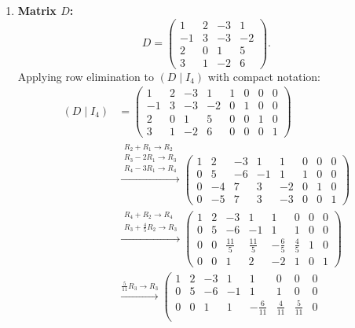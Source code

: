 \begin{exercisesolution*}
\begin{enumerate}[label=\textbf{(\alph*)}]
    \item \textbf{Matrix $D$:}
    \[
    D = \begin{pmatrix} 1 & 2 & -3 & 1 \\ -1 & 3 & -3 & -2 \\ 2 & 0 & 1 & 5 \\ 3 & 1 & -2 & 6 \end{pmatrix}.
    \]
    Applying row elimination to $(D \mid I_4)$ with compact notation:
    \begin{align*}
    (D \mid I_4) &=
    \left(\begin{array}{cccc|cccc}
    1 & 2 & -3 & 1 & 1 & 0 & 0 & 0 \\
    -1 & 3 & -3 & -2 & 0 & 1 & 0 & 0 \\
    2 & 0 & 1 & 5 & 0 & 0 & 1 & 0 \\
    3 & 1 & -2 & 6 & 0 & 0 & 0 & 1
    \end{array}\right) \\
    &\xrightarrow{\substack{R_2 + R_1 \to R_2 \\ R_3 - 2R_1 \to R_3 \\ R_4 - 3R_1 \to R_4}}
    \left(\begin{array}{cccc|cccc}
    1 & 2 & -3 & 1 & 1 & 0 & 0 & 0 \\
    0 & 5 & -6 & -1 & 1 & 1 & 0 & 0 \\
    0 & -4 & 7 & 3 & -2 & 0 & 1 & 0 \\
    0 & -5 & 7 & 3 & -3 & 0 & 0 & 1
    \end{array}\right) \\
    &\xrightarrow{\substack{R_4 + R_2 \to R_4 \\ R_3 + \frac{4}{5}R_2 \to R_3}}
    \left(\begin{array}{cccc|cccc}
    1 & 2 & -3 & 1 & 1 & 0 & 0 & 0 \\
    0 & 5 & -6 & -1 & 1 & 1 & 0 & 0 \\
    0 & 0 & \frac{11}{5} & \frac{11}{5} & -\frac{6}{5} & \frac{4}{5} & 1 & 0 \\
    0 & 0 & 1 & 2 & -2 & 1 & 0 & 1
    \end{array}\right) \\
    &\xrightarrow{\frac{5}{11}R_3 \to R_3}
    \left(\begin{array}{cccc|cccc}
    1 & 2 & -3 & 1 & 1 & 0 & 0 & 0 \\
    0 & 5 & -6 & -1 & 1 & 1 & 0 & 0 \\
    0 & 0 & 1 & 1 & -\frac{6}{11} & \frac{4}{11} & \frac{5}{11} & 0 \\

\end{array}
\end{align*}
\end{enumerate}
\end{exercisesolution*}
